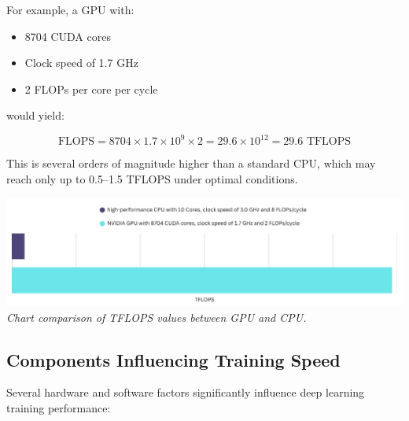 For example, a GPU with:
\begin{itemize}
    \item 8704 CUDA cores
    \item Clock speed of 1.7 GHz
    \item 2 FLOPs per core per cycle
\end{itemize}

would yield:

\[
\text{FLOPS} = 8704 \times 1.7 \times 10^9 \times 2 = 29.6 \times 10^{12} = 29.6 \text{ TFLOPS}
\]

This is several orders of magnitude higher than a standard CPU, which may reach only up to 0.5–1.5 
TFLOPS under optimal conditions.

\vspace{1em} 
\begin{center} 
    \includegraphics[width=\textwidth]{../assets/07-results/tflops-cpu-vs-gpu.png} 
    \small\textit{Chart comparison of TFLOPS values between GPU and CPU.} 
\end{center}
\vspace{1em} 


\subsection{Components Influencing Training Speed}

Several hardware and software factors significantly influence deep learning training performance:

